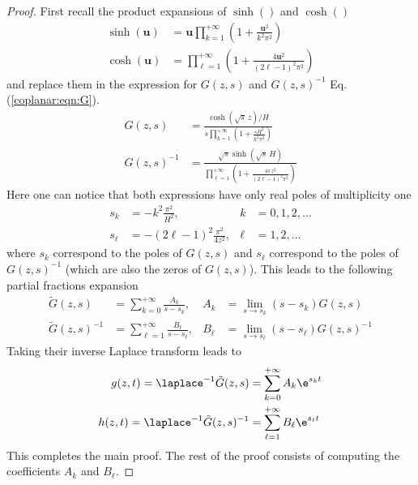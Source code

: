 \begin{proof}
	First recall the product expansions of $\sinh()$ and $\cosh()$
	\cite[{Eqs. ()} and {()}]{dlmf}
	\begin{subequations}
		\begin{align}
		\sinh(\bm{u}) &=
		\bm{u} \prod_{k=1}^{+\infty} \left( 1 + \frac{\bm{u}^{2}}{k^{2} \pi^{2}} \right)
		\\
		\cosh(\bm{u}) &=
		\prod_{\ell=1}^{+\infty} \left(
		1 + \frac{4 \bm{u}^{2}}{(2\ell - 1)^{2} \pi^{2}}
		\right)
		\end{align}
	\end{subequations}
	and replace them in the expression for $G(z,s)$ and $G(z,s)^{-1}$ Eq. (\ref{coplanar:eqn:G}).	
	\begin{subequations}
		\begin{align}
			G(z,s) &=
			\frac{
				\cosh(\sqrt{s}\,z)/H
			}{
				\displaystyle
				s \prod_{k=1}^{+\infty} \left( 1 + \frac{s H^{2}}{k^{2} \pi^{2}} \right)
			}
			\\
			G(z,s)^{-1} &=
			\frac{
				\sqrt{s} \sinh(\sqrt{s}\, H)
			}{
				\displaystyle
				\prod_{\ell=1}^{+\infty} \left(
				1 + \frac{4s\, z^{2}}{(2\ell - 1)^{2} \pi^{2}}
				\right)
			}
		\end{align}
	\end{subequations}
	Here one can notice that both expressions have only real poles of multiplicity one
	\begin{subequations}
		\begin{align}
			s_{k} &= -k^{2} \frac{\pi^{2}}{H^{2}},& k &= 0, 1, 2, \ldots
			\\
			s_{\ell} &= -(2\ell - 1)^{2} \frac{\pi^{2}}{4z^{2}},& \ell &= 1, 2, \ldots
		\end{align}
	\end{subequations}
	where $s_{k}$ correspond to the poles of $G(z,s)$ and
	$s_{\ell}$ correspond to the poles of $G(z,s)^{-1}$
	(which are also the zeros of $G(z,s)$).
	This leads to the following partial fractions expansion
	\begin{subequations}
		\begin{align}
			\tilde{G}(z,s) &= \sum_{k=0}^{+\infty} \frac{A_{k}}{s - s_{k}}, &
			A_{k} &= \lim_{s \to s_{k}} (s - s_{k}) G(z,s)
			\\
			\tilde{G}(z,s)^{-1} &= \sum_{\ell=1}^{+\infty} \frac{B_{\ell}}{s - s_{\ell}}, &
			B_{\ell} &= \lim_{s \to s_{\ell}} (s - s_{\ell}) G(z,s)^{-1}
		\end{align}
	\end{subequations}
	Taking their inverse Laplace transform leads to
	\begin{subequations}
		\begin{align}
			g(z,t) = \laplace^{-1} \tilde{G}(z,s)
			&= \sum_{k=0}^{+\infty} A_{k} \e^{s_{k} t}
			\\
			h(z,t) = \laplace^{-1} \tilde{G}(z,s)^{-1}
			&= \sum_{\ell=1}^{+\infty} B_{\ell} \e^{s_{\ell} t}
		\end{align}
	\end{subequations}
	This completes the main proof.
	The rest of the proof consists of computing the coefficients $A_{k}$ and $B_{\ell}$.


\end{proof}
